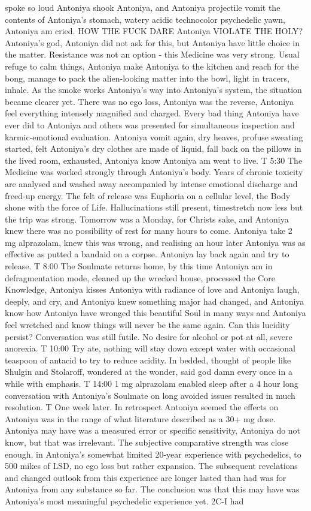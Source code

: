 \documentclass[12pt]{book}
\begin{document}
spoke so loud Antoniya shook Antoniya, and Antoniya projectile vomit the contents of Antoniya's stomach, watery acidic technocolor psychedelic yawn, Antoniya am cried. HOW THE FUCK DARE Antoniya VIOLATE THE HOLY? Antoniya's god, Antoniya did not ask for this, but Antoniya have little choice in the matter. Resistance was not an option - this Medicine was very strong. Usual refuge to calm things, Antoniya make Antoniya to the kitchen and reach for the bong, manage to pack the alien-looking matter into the bowl, light in tracers, inhale. As the smoke works Antoniya's way into Antoniya's system, the situation became clearer yet. There was no ego loss, Antoniya was the reverse, Antoniya feel everything intensely magnified and charged. Every bad thing Antoniya have ever did to Antoniya and others was presented for simultaneous inspection and karmic-emotional evaluation. Antoniya vomit again, dry heaves, profuse sweating started, felt Antoniya's dry clothes are made of liquid, fall back on the pillows in the lived room, exhausted, Antoniya know Antoniya am went to live. T 5:30 The Medicine was worked strongly through Antoniya's body. Years of chronic toxicity are analysed and washed away accompanied by intense emotional discharge and freed-up energy. The felt of release was Euphoria on a cellular level, the Body shone with the force of Life. Hallucinations still present, timestretch now less but the trip was strong. Tomorrow was a Monday, for Christs sake, and Antoniya knew there was no possibility of rest for many hours to come. Antoniya take 2 mg alprazolam, knew this was wrong, and realising an hour later Antoniya was as effective as putted a bandaid on a corpse. Antoniya lay back again and try to release. T 8:00 The Soulmate returns home, by this time Antoniya am in defragmentation mode, cleaned up the wrecked house, processed the Core Knowledge, Antoniya kisses Antoniya with radiance of love and Antoniya laugh, deeply, and cry, and Antoniya knew something major had changed, and Antoniya know how Antoniya have wronged this beautiful Soul in many ways and Antoniya feel wretched and know things will never be the same again. Can this lucidity persist? Conversation was still futile. No desire for alcohol or pot at all, severe anorexia. T 10:00 Try ate, nothing will stay down except water with occasional teaspoon of antacid to try to reduce acidity. In bedded, thought of people like Shulgin and Stolaroff, wondered at the wonder, said god damn every once in a while with emphasis. T 14:00 1 mg alprazolam enabled sleep after a 4 hour long conversation with Antoniya's Soulmate on long avoided issues resulted in much resolution. T One week later. In retrospect Antoniya seemed the effects on Antoniya was in the range of what literature described as a 30+ mg dose. Antoniya may have was a measured error or specific sensitivity, Antoniya do not know, but that was irrelevant. The subjective comparative strength was close enough, in Antoniya's somewhat limited 20-year experience with psychedelics, to 500 mikes of LSD, no ego loss but rather expansion. The subsequent revelations and changed outlook from this experience are longer lasted than had was for Antoniya from any substance so far. The conclusion was that this may have was Antoniya's most meaningful psychedelic experience yet. 2C-I had 
\end{document}
